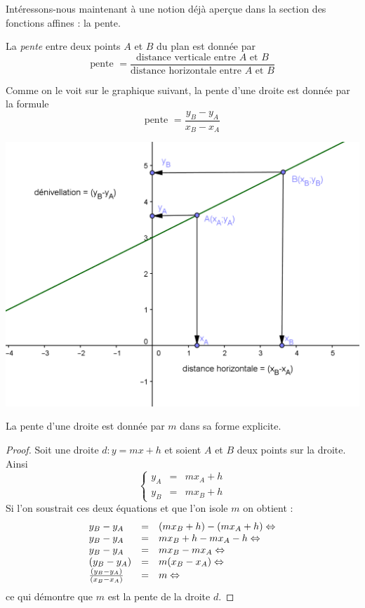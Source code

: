 Intéressons-nous maintenant à une notion déjà aperçue dans la section des fonctions affines : la pente.

\begin{definition}
La \emph{pente} entre deux points $A$ et $B$ du plan est donnée par 
$$
\mbox{pente } = \frac{\mbox{distance verticale entre }A\mbox{ et }B}{\mbox{distance horizontale entre }A\mbox{ et }B}
$$
\end{definition}

Comme on le voit sur le graphique suivant, la pente d'une droite est donnée par la formule
$$
\mbox{pente } = \frac{y_B-y_A}{x_B-x_A}
$$

\begin{center}
\includegraphics[width=0.9 \textwidth]{droite/droite_pente.png}
\end{center}

\begin{theoreme}
La pente d'une droite est donnée par $m$ dans sa forme explicite.
\end{theoreme}

\begin{proof}
Soit une droite $d:y = mx+h$ et soient $A$ et $B$ deux points sur la droite. Ainsi
$$
\left\{
\begin{array}{lcl}
y_A &=& mx_A + h\\
y_B &=& mx_B + h
\end{array}
\right.
$$
Si l'on soustrait ces deux équations et que l'on isole $m$ on obtient :
$$
\begin{array}{lcl}
y_B-y_A &=& (mx_B + h)-(mx_A + h)\Leftrightarrow \\
y_B-y_A &=& mx_B + h-mx_A - h\Leftrightarrow \\
y_B-y_A &=& mx_B-mx_A \Leftrightarrow \\
(y_B-y_A) &=& m(x_B-x_A)\Leftrightarrow \\
\frac{(y_B-y_A)}{(x_B-x_A)} &=& m\Leftrightarrow \\
\end{array}
$$
ce qui démontre que $m$ est la pente de la droite $d$.
\end{proof}

